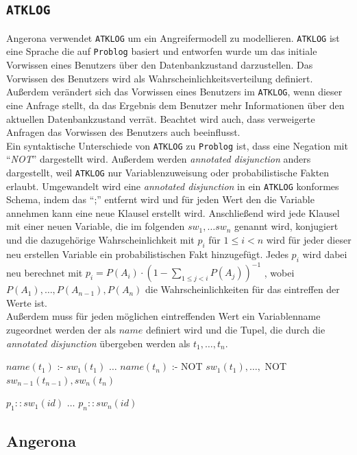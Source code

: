 \documentclass[german,version-2020-11]{uzl-thesis}
\begin{document}
\subsection{\texttt{ATKLOG}}
Angerona verwendet \texttt{ATKLOG} um ein Angreifermodell zu modellieren. \texttt{ATKLOG} ist eine Sprache die auf \texttt{Problog} basiert und entworfen wurde um das initiale Vorwissen eines Benutzers über den Datenbankzustand darzustellen. Das Vorwissen des Benutzers wird als Wahrscheinlichkeitsverteilung definiert. Außerdem verändert sich das Vorwissen eines Benutzers im \texttt{ATKLOG}, wenn dieser eine Anfrage stellt, da das Ergebnis dem Benutzer mehr Informationen über den aktuellen Datenbankzustand verrät. Beachtet wird auch, dass verweigerte Anfragen das Vorwissen des Benutzers auch beeinflusst.\cite{guarnieri2017securing} \\ 
Ein syntaktische Unterschiede von \texttt{ATKLOG} zu \texttt{Problog} ist, dass eine Negation mit \enquote{\textit{NOT}} dargestellt wird. Außerdem werden \textit{annotated disjunction} anders dargestellt, weil \texttt{ATKLOG} nur Variablenzuweisung oder probabilistische Fakten erlaubt. Umgewandelt wird eine \textit{annotated disjunction} in ein \texttt{ATKLOG} konformes Schema, indem das \enquote{;} entfernt wird und für jeden Wert den die Variable annehmen kann eine neue Klausel erstellt wird. Anschließend wird jede Klausel mit einer neuen Variable, die im folgenden $sw_1, \dots sw_n$ genannt wird, konjugiert und die dazugehörige Wahrscheinlichkeit mit $p_i$ für $1 \leq i < n$ wird für jeder dieser neu erstellen Variable ein probabilistischen Fakt hinzugefügt. Jedes $p_i$ wird dabei neu berechnet mit $p_i = P(A_i) \cdot (1 - \sum_{1\leq j<i}P(A_j))^{-1}$ , wobei $P(A_1), \dots ,P(A_{n-1}), P(A_n)$ die Wahrscheinlichkeiten für das eintreffen der Werte ist. \\
Außerdem muss für jeden möglichen eintreffenden Wert ein Variablenname zugeordnet werden der als $name$ definiert wird und die Tupel, die durch die \textit{annotated disjunction} übergeben werden als $t_1 , \dots , t_n$. 
\begin{Pseudocode}[caption={Vorgehensweise bei \textit{annotated disjunction}}, label={lst-2}, numbers=left]
$name(t_1)$ :- $sw_1(t_1)$
$\dots$
$name(t_n)$ :- NOT $sw_1(t_1), \dots ,$ NOT $sw_{n−1}(t_{n−1}), sw_n(t_n)$
	
$p_1::sw_1(id)$
$\dots$
$p_n::sw_n(id)$
\end{Pseudocode} 

\subsection{Angerona}
\end{document}
